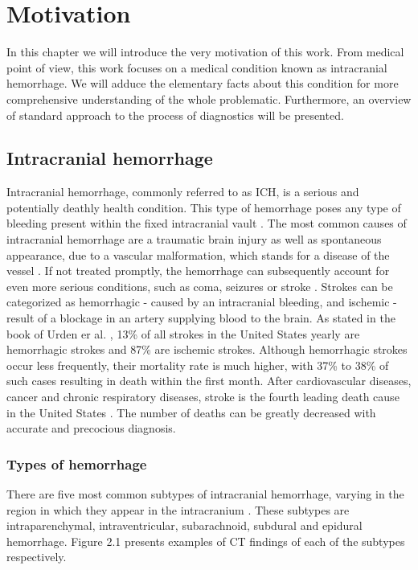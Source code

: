 \chapter{Motivation}

In this chapter we will introduce the very motivation of this work. From medical point of view, this work focuses on a medical condition known as intracranial hemorrhage. We will adduce the elementary facts about this condition for more comprehensive understanding of the whole problematic. Furthermore, an overview of standard approach to the process of diagnostics will be presented.

\section{Intracranial hemorrhage}
Intracranial hemorrhage, commonly referred to as ICH, is a serious and potentially deathly health condition. This type of hemorrhage poses any type of bleeding present within the fixed intracranial vault \cite{intracranial1}. The most common causes of intracranial hemorrhage are a traumatic brain injury as well as spontaneous appearance, due to a vascular malformation, which stands for a disease of the vessel \cite{intracranial2}. If not treated promptly, the hemorrhage can subsequently account for even more serious conditions, such as coma, seizures or stroke \cite{intracranial2}. Strokes can be categorized as hemorrhagic - caused by an intracranial bleeding, and ischemic - result of a blockage in an artery supplying blood to the brain. As stated in the book of Urden er al. \cite{ICHbookstats}, 13\% of all strokes in the United States yearly are hemorrhagic strokes and 87\% are ischemic strokes. Although hemorrhagic strokes occur less frequently, their mortality rate is much higher, with 37\% to 38\% of such cases resulting in death within the first month. After cardiovascular diseases, cancer and chronic respiratory diseases, stroke is the fourth leading death cause in the United States \cite{ICHbookstats}. The number of deaths can be greatly decreased with accurate and precocious diagnosis.

\subsection{Types of hemorrhage}
There are five most common subtypes of intracranial hemorrhage, varying in the region in which they appear in the intracranium \cite{ICHsubtypes-CT, imagingICH}. These subtypes are intraparenchymal, intraventricular, subarachnoid, subdural and epidural hemorrhage. Figure 2.1 presents examples of CT findings of each of the subtypes respectively.

